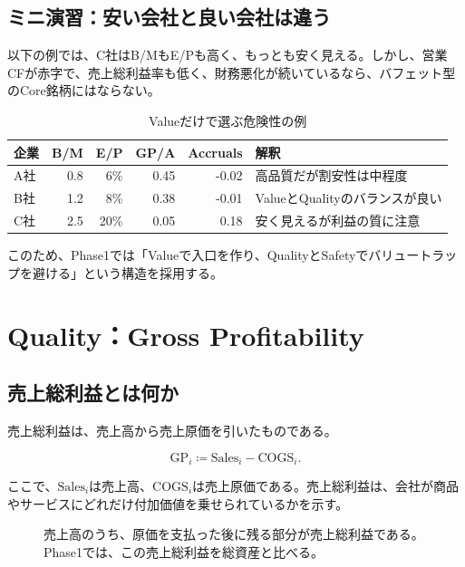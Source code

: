 \documentclass[11pt,a4paper]{article}
\newcommand{\GP}{\mathrm{GP}}
\newcommand{\COGS}{\mathrm{COGS}}
\begin{document}
\subsection{ミニ演習：安い会社と良い会社は違う}

以下の例では、C社はB/MもE/Pも高く、もっとも安く見える。しかし、営業CFが赤字で、売上総利益率も低く、財務悪化が続いているなら、バフェット型のCore銘柄にはならない。

\begin{table}[tbp]
\caption{Valueだけで選ぶ危険性の例}
\label{tab:value-trap}
\centering
\small
\begin{tabular}{lrrrrl}
\toprule
企業 & B/M & E/P & GP/A & Accruals & 解釈 \\
\midrule
A社 & 0.8 & 6\% & 0.45 & -0.02 & 高品質だが割安性は中程度 \\
B社 & 1.2 & 8\% & 0.38 & -0.01 & ValueとQualityのバランスが良い \\
C社 & 2.5 & 20\% & 0.05 & 0.18 & 安く見えるが利益の質に注意 \\
\bottomrule
\end{tabular}
\end{table}

このため、Phase1では「Valueで入口を作り、QualityとSafetyでバリュートラップを避ける」という構造を採用する。


\clearpage
\section{Quality：Gross Profitability}

\subsection{売上総利益とは何か}

売上総利益は、売上高から売上原価を引いたものである。

\begin{equation}
\GP_i \coloneqq \mathrm{Sales}_i - \COGS_i.
\label{eq:gross-profit}
\end{equation}

ここで、$\mathrm{Sales}_i$は売上高、$\COGS_i$は売上原価である。売上総利益は、会社が商品やサービスにどれだけ付加価値を乗せられているかを示す。

\begin{figure}[tbp]
\centering
{}
\caption{売上高のうち、原価を支払った後に残る部分が売上総利益である。Phase1では、この売上総利益を総資産と比べる。}
\label{fig:gross-profit}
\end{figure}
\end{document}
